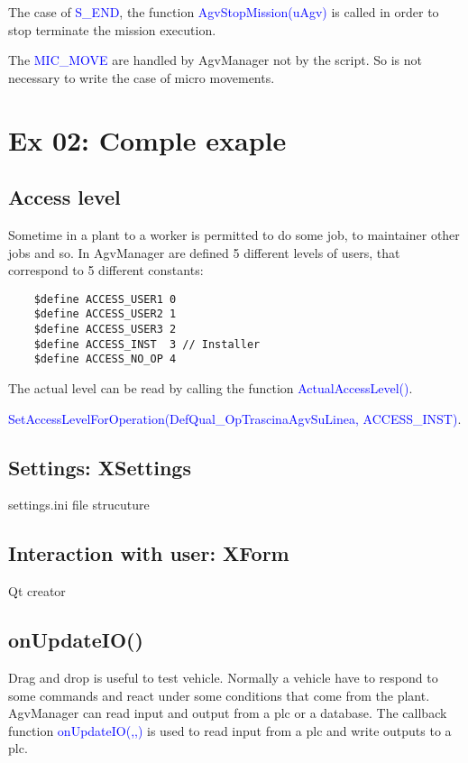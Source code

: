 The case of \textcolor{blue}{S\_END}, the function \textcolor{blue}{AgvStopMission(uAgv)} is called in order to stop terminate the mission execution.

The \textcolor{blue}{MIC\_MOVE} are handled by AgvManager not by the script. So is not necessary to write the case of micro movements.

\section{Ex 02: Comple exaple}%

\subsection{Access level}
Sometime in a plant to a worker is permitted to do some job, to maintainer other jobs and so. In AgvManager are defined 5 different levels of users, that correspond to 5 different constants:

\begin{lstlisting}
	$define ACCESS_USER1 0
	$define ACCESS_USER2 1
	$define ACCESS_USER3 2
	$define ACCESS_INST  3 // Installer
	$define ACCESS_NO_OP 4
\end{lstlisting}

The actual level can be read by calling the function \textcolor{blue}{ActualAccessLevel()}.

\textcolor{blue}{SetAccessLevelForOperation(DefQual\_OpTrascinaAgvSuLinea, ACCESS\_INST)}.

\subsection{Settings: XSettings}

settings.ini file strucuture

\subsection{Interaction with user: XForm}
Qt creator

\subsection{onUpdateIO()}
Drag and drop is useful to test vehicle. Normally a vehicle have to respond to some commands and react under some conditions that come from the plant. AgvManager can read input and output from a plc or a database. The callback function \textcolor{blue}{onUpdateIO(,,)} is used to read input from a plc and write outputs to a plc.


